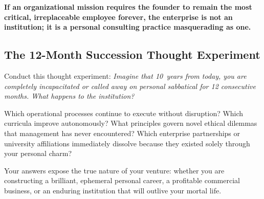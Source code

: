\textbf{If an organizational mission requires the founder to remain the most critical, irreplaceable employee forever, the enterprise is not an institution; it is a personal consulting practice masquerading as one.}

\subsection{The 12-Month Succession Thought Experiment}

Conduct this thought experiment: \textit{Imagine that 10~years from today, you are completely incapacitated or called away on personal sabbatical for 12 consecutive months. What happens to the institution?}

Which operational processes continue to execute without disruption? Which curricula improve autonomously? What principles govern novel ethical dilemmas that management has never encountered? Which enterprise partnerships or university affiliations immediately dissolve because they existed solely through your personal charm?

Your answers expose the true nature of your venture: whether you are constructing a brilliant, ephemeral personal career, a profitable commercial business, or an enduring institution that will outlive your mortal life.
